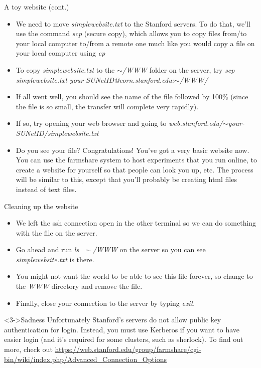 \documentclass{beamer}
\begin{document}
\begin{frame}{A toy website (cont.)}
\begin{itemize}
    \item<1-> We need to move \emph{simplewebsite.txt} to the Stanford servers. To do that, we'll use the command \emph{scp} (secure copy), which allows you to copy files from/to your local computer to/from a remote one much like you would copy a file on your local computer using \emph{cp} 
    \item<2-> To copy \emph{simplewebsite.txt} to the \emph{$\sim$/WWW} folder on the server, try \emph{scp simplewebsite.txt your-SUNetID@corn.stanford.edu:$\sim$/WWW/} 
    \item<3-> If all went well, you should see the name of the file followed by 100\% (since the file is so small, the transfer will complete very rapidly). 
    \item<3-> If so, try opening your web browser and going to \emph{web.stanford.edu/$\sim$your-SUNetID/simplewebsite.txt} 
    \item<4-> Do you see your file? Congratulations! You've got a very basic website now. You can use the farmshare system to host experiments that you run online, to create a website for yourself so that people can look you up, etc. The process will be similar to this, except that you'll probably be creating html files instead of text files. 
\end{itemize}
\end{frame}

\begin{frame}{Cleaning up the website}
\begin{itemize}
    \item<1-> We left the ssh connection open in the other terminal so we can do something with the file on the server.
    \item<2-> Go ahead and run \emph{ls $\;\sim$/WWW} on the server so you can see \emph{simplewebsite.txt} is there.
    \item<3-> You might not want the world to be able to see this file forever, so change to the \emph{WWW} directory and remove the file.
    \item<4-> Finally, close your connection to the server by typing \emph{exit}.
\end{itemize}
\begin{alertblock}<3->{Sadness}
Unfortunately Stanford's servers do not allow public key authentication for login. Instead, you must use Kerberos if you want to have easier login (and it's required for some clusters, such as sherlock). To find out more, check out {\color{blue} \url{https://web.stanford.edu/group/farmshare/cgi-bin/wiki/index.php/Advanced_Connection_Options}} 
\end{alertblock}
\end{frame}
\end{document}
